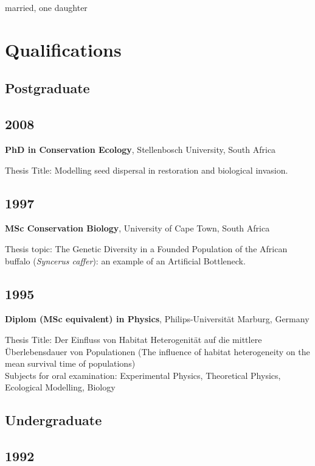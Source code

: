 \documentclass[a4paper]{article}
\begin{document}
married, one daughter

\section{Qualifications}

\subsection{Postgraduate}


\subsection{2008}

\textbf{PhD in Conservation Ecology}, Stellenbosch University, South Africa

Thesis Title: Modelling seed dispersal in restoration and biological
invasion.

\subsection{1997}

\textbf{MSc Conservation Biology}, University of Cape Town, South Africa

Thesis topic: The Genetic Diversity in a Founded Population of the
African buffalo (\emph{Syncerus caffer}): an example of an Artificial
Bottleneck.

\subsection{1995}

\textbf{Diplom (MSc equivalent) in Physics}, Philips-Universität Marburg, Germany

Thesis Title: Der Einfluss von Habitat Heterogenität auf die mittlere
Überlebensdauer von Populationen (The influence of habitat heterogeneity
on the mean survival time of populations)\\
Subjects for oral examination: Experimental Physics, Theoretical
Physics, Ecological Modelling, Biology

\subsection{Undergraduate}

\subsection{1992}
\end{document}
